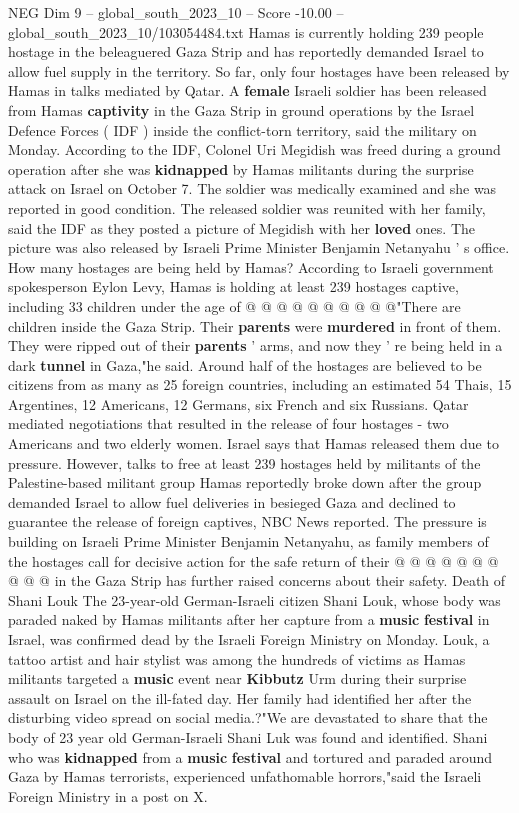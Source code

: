 \begin{textsample}{NEG Dim 9 – global\_south\_2023\_10 – Score -10.00 – global\_south\_2023\_10/103054484.txt}  \label{ex:f9_neg_361}
Hamas is currently holding 239 people hostage in the beleaguered Gaza Strip and has reportedly demanded Israel to allow fuel supply in the territory.
So far, only four hostages have been released by Hamas in talks mediated by Qatar.
A \textbf{female} Israeli soldier has been released from Hamas \textbf{captivity} in the Gaza Strip in ground operations by the Israel Defence Forces ( IDF ) inside the conflict-torn territory, said the military on Monday.
According to the IDF, Colonel Uri Megidish was freed during a ground operation after she was \textbf{kidnapped} by Hamas militants during the surprise attack on Israel on October 7.
The soldier was medically examined and she was reported in good condition.
The released soldier was reunited with her family, said the IDF as they posted a picture of Megidish with her \textbf{loved} ones.
The picture was also released by Israeli Prime Minister Benjamin Netanyahu ' s office.
How many hostages are being held by Hamas?
According to Israeli government spokesperson Eylon Levy, Hamas is holding at least 239 hostages captive, including 33 children under the age of @ @ @ @ @ @ @ @ @ @"There are children inside the Gaza Strip.
Their \textbf{parents} were \textbf{murdered} in front of them.
They were ripped out of their \textbf{parents} ' arms, and now they ' re being held in a dark \textbf{tunnel} in Gaza,"he said.
Around half of the hostages are believed to be citizens from as many as 25 foreign countries, including an estimated 54 Thais, 15 Argentines, 12 Americans, 12 Germans, six French and six Russians.
Qatar mediated negotiations that resulted in the release of four hostages - two Americans and two elderly women.
Israel says that Hamas released them due to pressure.
However, talks to free at least 239 hostages held by militants of the Palestine-based militant group Hamas reportedly broke down after the group demanded Israel to allow fuel deliveries in besieged Gaza and declined to guarantee the release of foreign captives, NBC News reported.
The pressure is building on Israeli Prime Minister Benjamin Netanyahu, as family members of the hostages call for decisive action for the safe return of their @ @ @ @ @ @ @ @ @ @ in the Gaza Strip has further raised concerns about their safety.
Death of Shani Louk The 23-year-old German-Israeli citizen Shani Louk, whose body was paraded naked by Hamas militants after her capture from a \textbf{music} \textbf{festival} in Israel, was confirmed dead by the Israeli Foreign Ministry on Monday.
Louk, a tattoo artist and hair stylist was among the hundreds of victims as Hamas militants targeted a \textbf{music} event near \textbf{Kibbutz} Urm during their surprise assault on Israel on the ill-fated day.
Her family had identified her after the disturbing video spread on social media.?"We are devastated to share that the body of 23 year old German-Israeli Shani Luk was found and identified.
Shani who was \textbf{kidnapped} from a \textbf{music} \textbf{festival} and tortured and paraded around Gaza by Hamas terrorists, experienced unfathomable horrors,"said the Israeli Foreign Ministry in a post on X.


\end{textsample}
